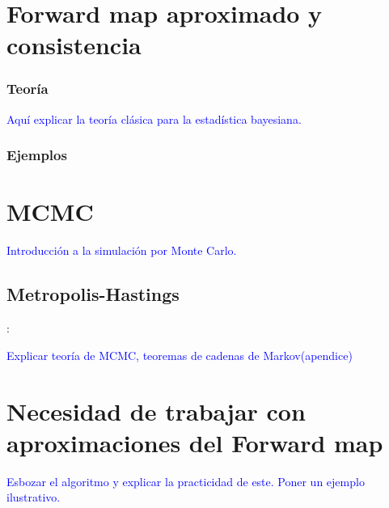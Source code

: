 \section{Forward map aproximado y consistencia}

\subsubsection{Teoría}
\textcolor{blue}{Aquí explicar la teoría clásica para la estadística bayesiana.}

\subsubsection{Ejemplos}


\section{MCMC}

\textcolor{blue}{Introducción a la simulación por Monte Carlo.}


\subsection{Metropolis-Hastings}:

\textcolor{blue}{Explicar teoría de MCMC, teoremas de cadenas de Markov(apendice)}


\section{Necesidad de trabajar con aproximaciones del Forward map}

\vspace{1 cm} 

\textcolor{blue}{Esbozar el algoritmo y explicar la practicidad de este. Poner un ejemplo ilustrativo.}

